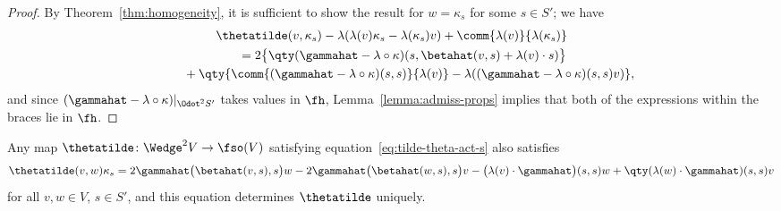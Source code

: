 \begin{proof}
	By Theorem~\ref{thm:homogeneity}, it is sufficient to show the result for $w=\kappa_s$ for some $s\in S'$; we have
	\begin{gather*}
		\thetatilde(v,\kappa_s) - \lambda(\lambda(v)\kappa_s-\lambda(\kappa_s)v) + \comm{\lambda(v)}{\lambda(\kappa_s)}\\
			\qquad= 2\big\{\qty(\gammahat-\lambda\circ\kappa)(s,\betahat(v,s)+\lambda(v)\cdot s)\big\}\\
				\phantom{\qquad= }{} + \qty{\comm{(\gammahat-\lambda\circ\kappa)(s,s)}{\lambda(v)} - \lambda((\gammahat-\lambda\circ\kappa)(s,s)v)},
	\end{gather*}
	and since $(\gammahat-\lambda\circ\kappa)|_{\Odot^2S'}$ takes values in $\fh$, Lemma~\ref{lemma:admiss-props} implies that both of the expressions within the braces lie in $\fh$.
\end{proof}

\begin{Lemma}\label{lemma:tilde-theta-def-2}
	Any map $\thetatilde\colon\Wedge^2 V\to \fso(V)$ satisfying equation~\eqref{eq:tilde-theta-act-s} also satisfies
	\begin{gather*}
		\thetatilde(v,w)\kappa_s
			= 2\gammahat\bigl(\betahat(v,s),s\bigr)w
				- 2\gammahat\bigl(\betahat(w,s),s\bigr)v- \bigl(\lambda(v)\cdot\gammahat\bigr)(s,s)w
				+ \qty(\lambda(w)\cdot\gammahat)(s,s)v\label{eq:tilde-theta-def-2}
	\end{gather*}
	for all $v,w\in V$, $s\in S'$, and this equation determines $\thetatilde$ uniquely.
\end{Lemma}

